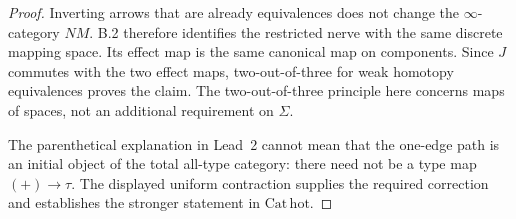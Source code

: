 \begin{proof}
Inverting arrows that are already equivalences does not change the $\infty$-category $NM$. B.2 therefore identifies the restricted nerve with the same discrete mapping space. Its effect map is the same canonical map on components. Since $J$ commutes with the two effect maps, two-out-of-three for weak homotopy equivalences proves the claim. The two-out-of-three principle here concerns maps of spaces, not an additional requirement on $\Sigma$.

The parenthetical explanation in Lead~2 cannot mean that the one-edge path is an initial object of the total all-type category: there need not be a type map $(+)\to\tau$. The displayed uniform contraction supplies the required correction and establishes the stronger statement in $\mathrm{Cat}\,\mathrm{hot}$.
\end{proof}

